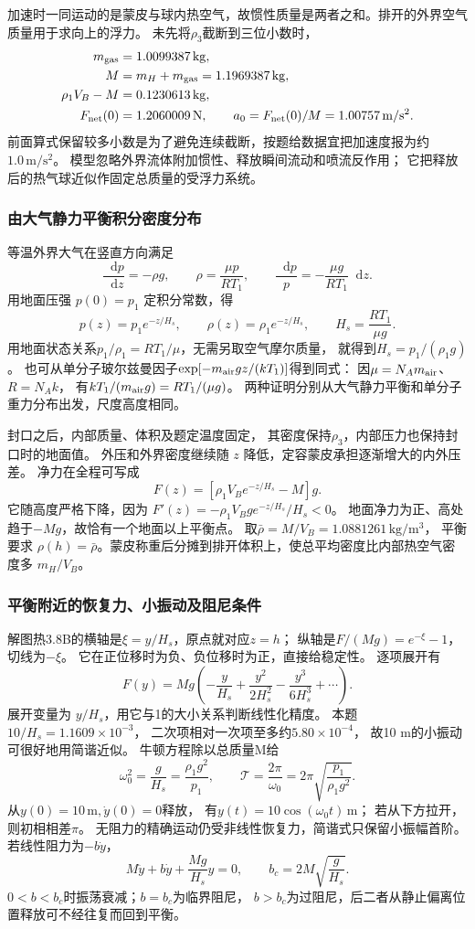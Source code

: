 \documentclass[UTF8,fontset=fandol,a4paper,11pt]{ctexart}
\newcommand{\dd}{\mathop{}\!\mathrm{d}}
\begin{document}
加速时一同运动的是蒙皮与球内热空气，故惯性质量是两者之和。排开的外界空气质量用于求向上的浮力。
未先将$\rho_3$截断到三位小数时，
\[
\begin{aligned}
m_{\rm gas}&=1.0099387\,\mathrm{kg},\\
M&=m_H+m_{\rm gas}=1.1969387\,\mathrm{kg},\\
\rho_1V_B-M&=0.1230613\,\mathrm{kg},\\
F_{\rm net}(0)&=1.2060009\,\mathrm N,\qquad
a_0=F_{\rm net}(0)/M=1.00757\,\mathrm{m/s^2}.
\end{aligned}
\]
前面算式保留较多小数是为了避免连续截断，按题给数据宜把加速度报为约$1.0\,\mathrm{m/s^2}$。
模型忽略外界流体附加惯性、释放瞬间流动和喷流反作用；
它把释放后的热气球近似作固定总质量的受浮力系统。

\subsubsection*{由大气静力平衡积分密度分布}
等温外界大气在竖直方向满足
\[
\frac{\dd p}{\dd z}=-\rho g,\qquad
\rho=\frac{\mu p}{RT_1},\qquad
\frac{\dd p}{p}=-\frac{\mu g}{RT_1}\dd z.
\]
用地面压强 $p(0)=p_1$ 定积分常数，得
\[
p(z)=p_1e^{-z/H_s},\qquad
\rho(z)=\rho_1e^{-z/H_s},\qquad
H_s=\frac{RT_1}{\mu g}.
\]
用地面状态关系$p_1/\rho_1=RT_1/\mu$，无需另取空气摩尔质量，
就得到$H_s=p_1/(\rho_1g)$。
也可从单分子玻尔兹曼因子$\exp[-m_{\rm air}gz/(kT_1)]$得到同式：
因$\mu=N_Am_{\rm air}$、$R=N_Ak$，
有$kT_1/(m_{\rm air}g)=RT_1/(\mu g)$。
两种证明分别从大气静力平衡和单分子重力分布出发，尺度高度相同。

封口之后，内部质量、体积及题定温度固定，
其密度保持$\rho_3$，内部压力也保持封口时的地面值。
外压和外界密度继续随 $z$ 降低，定容蒙皮承担逐渐增大的内外压差。
净力在全程可写成
\[
F(z)=[\rho_1V_Be^{-z/H_s}-M]g.
\]
它随高度严格下降，因为
$F'(z)=-\rho_1V_Bg e^{-z/H_s}/H_s<0$。
地面净力为正、高处趋于$-Mg$，故恰有一个地面以上平衡点。
取$\bar\rho=M/V_B=1.0881261\,\mathrm{kg/m^3}$，
平衡要求 $\rho(h)=\bar\rho$。蒙皮称重后分摊到排开体积上，使总平均密度比内部热空气密度多 $m_H/V_B$。

\subsubsection*{平衡附近的恢复力、小振动及阻尼条件}
解图热3.8B的横轴是$\xi=y/H_s$，原点就对应$z=h$；
纵轴是$F/(Mg)=e^{-\xi}-1$，切线为$-\xi$。
它在正位移时为负、负位移时为正，直接给稳定性。
逐项展开有
\[
F(y)=Mg\left(-\frac y{H_s}
+\frac{y^2}{2H_s^2}-\frac{y^3}{6H_s^3}+\cdots\right).
\]
展开变量为 $y/H_s$，用它与1的大小关系判断线性化精度。
本题$10/H_s=1.1609\times10^{-3}$，
二次项相对一次项至多约$5.80\times10^{-4}$，
故10 m的小振动可很好地用简谐近似。
牛顿方程除以总质量M给
\[
\omega_0^2=\frac g{H_s}
=\frac{\rho_1g^2}{p_1},\qquad
\mathcal T=\frac{2\pi}{\omega_0}
=2\pi\sqrt{\frac{p_1}{\rho_1g^2}}.
\]
从$y(0)=10\,\mathrm m,\dot y(0)=0$释放，
有$y(t)=10\cos(\omega_0t)\,\mathrm m$；
若从下方拉开，则初相相差$\pi$。
无阻力的精确运动仍受非线性恢复力，简谐式只保留小振幅首阶。
若线性阻力为$-b\dot y$，
\[
M\ddot y+b\dot y+\frac{Mg}{H_s}y=0,\qquad
b_c=2M\sqrt{\frac g{H_s}}.
\]
$0<b<b_c$时振荡衰减；$b=b_c$为临界阻尼，
$b>b_c$为过阻尼，后二者从静止偏离位置释放可不经往复而回到平衡。
\end{document}

